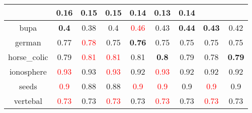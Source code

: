 \documentclass{article}%
\begin{document}
\begin{tabular}{c|cccccccc}
{}&\textbf{0.16}&0.15&\textbf{0.15}&0.14&0.13&\textbf{0.14}\\%
\hline%
bupa&\textbf{0.4}&0.38&0.4&\textcolor{red}{ 
0.46
}&0.43&\textbf{0.44}&\textbf{0.43}&0.42\\%
\hline%
german&0.77&\textcolor{red}{ 
0.78
}&0.75&\textbf{0.76}&0.75&0.75&0.75&0.75\\%
\hline%
horse\_colic&0.79&\textcolor{red}{ 
0.81
}&\textcolor{red}{ 
0.81
}&0.81&\textbf{0.8}&0.79&0.78&\textbf{0.79}\\%
\hline%
ionosphere&\textcolor{red}{ 
0.93
}&0.93&\textcolor{red}{ 
0.93
}&0.92&\textcolor{red}{ 
0.93
}&0.92&0.92&0.92\\%
\hline%
seeds&\textcolor{red}{ 
0.9
}&0.88&0.88&\textcolor{red}{ 
0.9
}&\textcolor{red}{ 
0.9
}&0.9&\textcolor{red}{ 
0.9
}&0.9\\%
\hline%
vertebal&\textcolor{red}{ 
0.73
}&0.73&\textcolor{red}{ 
0.73
}&0.73&\textcolor{red}{ 
0.73
}&0.73&\textcolor{red}{ 
0.73
}&0.73\\%
\hline%
\end{tabular}

%
\end{document}
